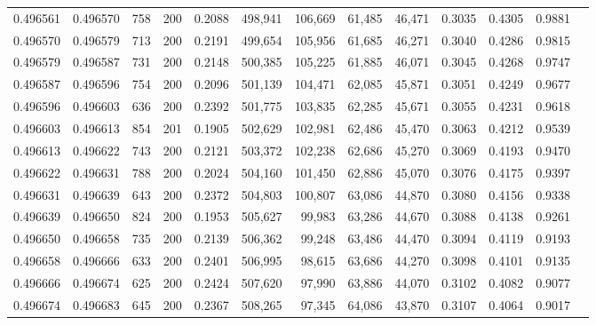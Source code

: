 \begin{tabular}{rrrrrrrrrrrrr}
0.496561 & 0.496570 &   758 & 200 &                                     0.2088 & 498,941 & 106,669 &  61,485 &  46,471 & 0.3035 & 0.4305 & 0.9881 \\
0.496570 & 0.496579 &   713 & 200 &                                     0.2191 & 499,654 & 105,956 &  61,685 &  46,271 & 0.3040 & 0.4286 & 0.9815 \\
0.496579 & 0.496587 &   731 & 200 &                                     0.2148 & 500,385 & 105,225 &  61,885 &  46,071 & 0.3045 & 0.4268 & 0.9747 \\
0.496587 & 0.496596 &   754 & 200 &                                     0.2096 & 501,139 & 104,471 &  62,085 &  45,871 & 0.3051 & 0.4249 & 0.9677 \\
0.496596 & 0.496603 &   636 & 200 &                                     0.2392 & 501,775 & 103,835 &  62,285 &  45,671 & 0.3055 & 0.4231 & 0.9618 \\
0.496603 & 0.496613 &   854 & 201 &                                     0.1905 & 502,629 & 102,981 &  62,486 &  45,470 & 0.3063 & 0.4212 & 0.9539 \\
0.496613 & 0.496622 &   743 & 200 &                                     0.2121 & 503,372 & 102,238 &  62,686 &  45,270 & 0.3069 & 0.4193 & 0.9470 \\
0.496622 & 0.496631 &   788 & 200 &                                     0.2024 & 504,160 & 101,450 &  62,886 &  45,070 & 0.3076 & 0.4175 & 0.9397 \\
0.496631 & 0.496639 &   643 & 200 &                                     0.2372 & 504,803 & 100,807 &  63,086 &  44,870 & 0.3080 & 0.4156 & 0.9338 \\
0.496639 & 0.496650 &   824 & 200 &                                     0.1953 & 505,627 &  99,983 &  63,286 &  44,670 & 0.3088 & 0.4138 & 0.9261 \\
0.496650 & 0.496658 &   735 & 200 &                                     0.2139 & 506,362 &  99,248 &  63,486 &  44,470 & 0.3094 & 0.4119 & 0.9193 \\
0.496658 & 0.496666 &   633 & 200 &                                     0.2401 & 506,995 &  98,615 &  63,686 &  44,270 & 0.3098 & 0.4101 & 0.9135 \\
0.496666 & 0.496674 &   625 & 200 &                                     0.2424 & 507,620 &  97,990 &  63,886 &  44,070 & 0.3102 & 0.4082 & 0.9077 \\
0.496674 & 0.496683 &   645 & 200 &                                     0.2367 & 508,265 &  97,345 &  64,086 &  43,870 & 0.3107 & 0.4064 & 0.9017 \\

\end{tabular}

